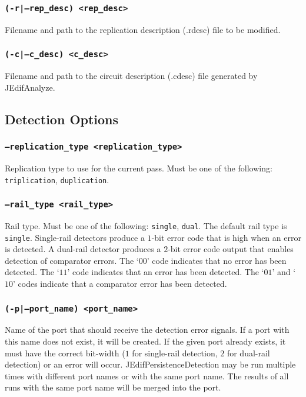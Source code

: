 \subsubsection{\texttt{(-r|--rep\_desc) <rep\_desc>}}
Filename and path to the replication description (.rdesc) file to be modified.

\subsubsection{\texttt{(-c|--c\_desc) <c\_desc>}}
Filename and path to the circuit description (.cdesc) file generated by
JEdifAnalyze.


\subsection{Detection Options}

\subsubsection{\texttt{--replication\_type <replication\_type>}}
Replication type to use for the current pass. Must be one of the following:
\texttt{triplication}, \texttt{duplication}.

\subsubsection{\texttt{--rail\_type <rail\_type>}}
Rail type. Must be one of the following: \texttt{single}, \texttt{dual}. The
default rail type is \texttt{single}. Single-rail detectors produce a $1$-bit
error code that is high when an error is detected. A dual-rail detector produces
a $2$-bit error code output that enables detection of comparator errors. The
`\texttt{$00$}' code indicates that no error has been detected. The
`\texttt{$11$}' code indicates that an error has been detected. The
`\texttt{$01$}' and `\texttt{$10$}' codes indicate that a comparator error has
been detected.

\subsubsection{\texttt{(-p|--port\_name) <port\_name>}}
Name of the port that should receive the detection error signals. If a port
with this name does not exist, it will be created. If the given port already
exists, it must have the correct bit-width ($1$ for single-rail detection, $2$
for dual-rail detection) or an error will occur. JEdifPersistenceDetection may
be run multiple times with different port names or with the same port name.
The results of all runs with the same port name will be merged into the port.

